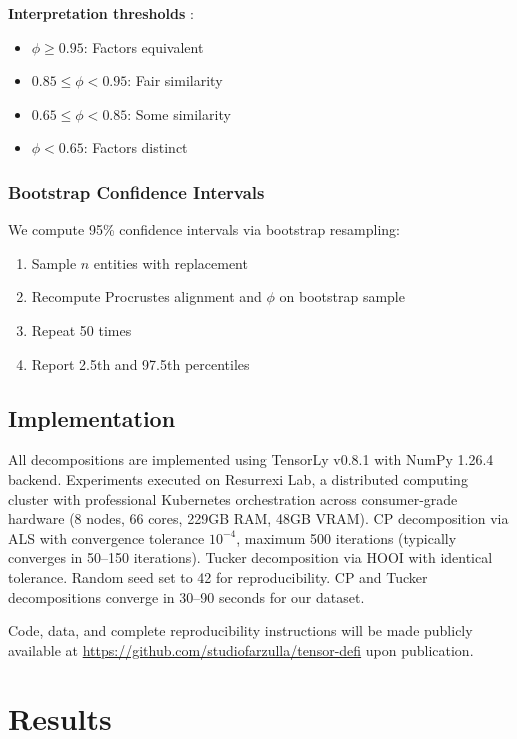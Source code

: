 \documentclass[11pt,twocolumn]{article}
\begin{document}
\textbf{Interpretation thresholds} \citep{Lorenzo-Seva2006Tucker}:
\begin{itemize}[leftmargin=*]
    \item $\phi \geq 0.95$: Factors equivalent
    \item $0.85 \leq \phi < 0.95$: Fair similarity
    \item $0.65 \leq \phi < 0.85$: Some similarity
    \item $\phi < 0.65$: Factors distinct
\end{itemize}

\subsubsection{Bootstrap Confidence Intervals}

We compute 95\% confidence intervals via bootstrap resampling:

\begin{enumerate}[leftmargin=*]
    \item Sample $n$ entities with replacement
    \item Recompute Procrustes alignment and $\phi$ on bootstrap sample
    \item Repeat 50 times
    \item Report 2.5th and 97.5th percentiles
\end{enumerate}

\subsection{Implementation}

All decompositions are implemented using TensorLy v0.8.1 \citep{Kossaifi2019TensorLy} with NumPy 1.26.4 backend. Experiments executed on Resurrexi Lab, a distributed computing cluster with professional Kubernetes orchestration across consumer-grade hardware (8 nodes, 66 cores, 229GB RAM, 48GB VRAM). CP decomposition via ALS with convergence tolerance $10^{-4}$, maximum 500 iterations (typically converges in 50--150 iterations). Tucker decomposition via HOOI with identical tolerance. Random seed set to 42 for reproducibility. CP and Tucker decompositions converge in 30--90 seconds for our dataset.

Code, data, and complete reproducibility instructions will be made publicly available at \url{https://github.com/studiofarzulla/tensor-defi} upon publication.

\section{Results}
\label{sec:results}
\end{document}
